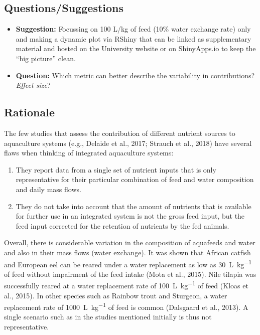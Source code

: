 \documentclass[
]{article}
\providecommand{\tightlist}{%
  \setlength{\itemsep}{0pt}\setlength{\parskip}{0pt}}
\begin{document}
\hypertarget{questionssuggestions}{%
\subsection{Questions/Suggestions}\label{questionssuggestions}}

\begin{itemize}
\tightlist
\item
  \textbf{Suggestion:} Focussing on 100 L/kg of feed (10\% water
  exchange rate) only and making a dynamic plot via RShiny that can be
  linked as supplementary material and hosted on the University website
  or on ShinyApps.io to keep the ``big picture'' clean.
\item
  \textbf{Question:} Which metric can better describe the variability in
  contributions? \emph{Effect size}?
\end{itemize}

\hypertarget{rationale}{%
\subsection{Rationale}\label{rationale}}

The few studies that assess the contribution of different nutrient
sources to aquaculture systems (e.g., Delaide et al., 2017; Strauch et
al., 2018) have several flaws when thinking of integrated aquaculture
systems:

\begin{enumerate}
\def\labelenumi{\arabic{enumi}.}
\tightlist
\item
  They report data from a single set of nutrient inputs that is only
  representative for their particular combination of feed and water
  composition and daily mass flows.
\item
  They do not take into account that the amount of nutrients that is
  available for further use in an integrated system is not the gross
  feed input, but the feed input corrected for the retention of
  nutrients by the fed animals.
\end{enumerate}

Overall, there is considerable variation in the composition of aquafeeds
and water and also in their mass flows (water exchange). It was shown
that African catfish and European eel can be reared under a water
replacement as low as \SI{30}{\liter\per\kg} of feed without impairment
of the feed intake (Mota et al., 2015). Nile tilapia was successfully
reared at a water replacement rate of \SI{100}{\liter\per\kg} of feed
(Kloas et al., 2015). In other species such as Rainbow trout and
Sturgeon, a water replacement rate of \SI{1000}{\liter\per\kg} of feed
is common (Dalsgaard et al., 2013). A single scenario such as in the
studies mentioned initially is thus not representative.
\end{document}
